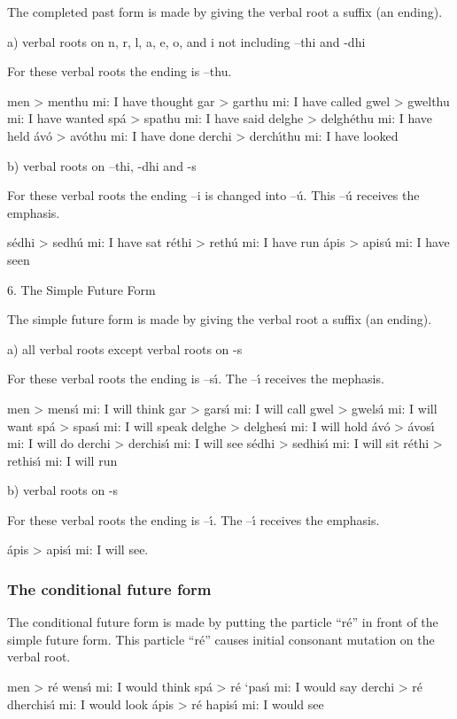 The completed past form is made by giving the verbal root a suffix (an ending). 

a) verbal roots on n, r, l, a, e, o, and i not including –thi and -dhi

For these verbal roots the ending is –thu.

men > menthu mi: I have thought
gar > garthu mi: I have called
gwel > gwelthu mi: I have wanted
sp\'{a} > spathu mi: I have said
delghe > delgh\'{e}thu mi: I have held
\'{a}v\'{o} > av\'{o}thu mi: I have done
derchi > derch\'{\i}thu mi: I have looked

b) verbal roots on –thi, -dhi and -s

For these verbal roots the ending –i is changed into –\'{u}. This –\'{u} receives the emphasis.

s\'{e}dhi > sedh\'{u} mi: I have sat
r\'{e}thi > reth\'{u} mi: I have run
\'{a}pis > apis\'{u} mi: I have seen

6. The Simple Future Form

The simple future form is made by giving the verbal root a suffix (an ending).

a) all verbal roots except verbal roots on -s

For these verbal roots the ending is –s\'{\i}. The –\'{\i} receives the mephasis.

men > mens\'{\i} mi: I will think
gar > gars\'{\i} mi: I will call
gwel > gwels\'{\i} mi: I will want
sp\'{a} > spas\'{\i} mi: I will speak
delghe > delghes\'{\i} mi: I will hold
\'{a}v\'{o} > \'{a}vos\'{\i} mi: I will do
derchi > derchis\'{\i} mi: I will see
s\'{e}dhi > sedhis\'{\i} mi: I will sit
r\'{e}thi > rethis\'{\i} mi: I will run

b) verbal roots on -s

For these verbal roots the ending is –\'{\i}. The –\'{\i} receives the emphasis.

\'{a}pis > apis\'{\i} mi: I will see.

\subsubsection{The conditional future form}

The conditional future form is made by putting the particle “r\'{e}” in front of the simple future form. This particle “r\'{e}” causes initial consonant mutation on the verbal root.

men > r\'{e} wens\'{\i} mi: I would think
sp\'{a} > r\'{e} ‘pas\'{\i} mi: I would say
derchi > r\'{e} dherchis\'{\i} mi: I would look
\'{a}pis > r\'{e} hapis\'{\i} mi: I would see


